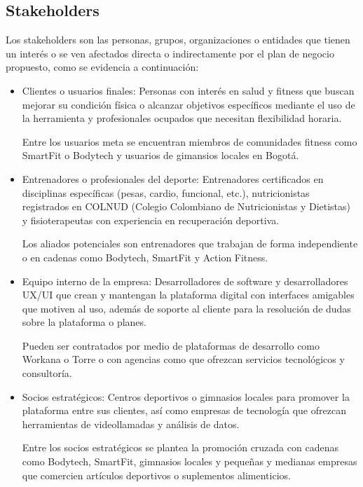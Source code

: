 \subsection{Stakeholders}

{\color{red}
Los stakeholders son las personas, grupos, organizaciones o entidades que tienen un interés o se ven afectados directa o indirectamente por el plan de negocio propuesto, como se evidencia a continuación: 

\begin{itemize}
    \item Clientes o usuarios finales: Personas con interés en salud y fitness que buscan mejorar su condición física o alcanzar objetivos específicos mediante el uso de la herramienta y profesionales ocupados que necesitan flexibilidad horaria. 

    Entre los usuarios meta se encuentran miembros de comunidades fitness como SmartFit o Bodytech y usuarios de gimansios locales en Bogotá.
    
    \item Entrenadores o profesionales del deporte: Entrenadores certificados en disciplinas específicas (pesas, cardio, funcional, etc.), nutricionistas registrados en COLNUD (Colegio Colombiano de Nutricionistas y Dietistas) y fisioterapeutas con experiencia en recuperación deportiva. 

    Los aliados potenciales son entrenadores que trabajan de forma independiente o en cadenas como Bodytech, SmartFit y Action Fitness. 
    
    \item Equipo interno de la empresa: Desarrolladores de software y desarrolladores UX/UI que crean y mantengan la plataforma digital con interfaces amigables que motiven al uso, además de soporte al cliente para la resolución de dudas sobre la plataforma o planes. 

    Pueden ser contratados por medio de plataformas de desarrollo como Workana o Torre o con agencias como que ofrezcan servicios tecnológicos y consultoría. 
    
    \item Socios estratégicos: Centros deportivos o gimnasios locales para promover la plataforma entre sus clientes, así como empresas de tecnología que ofrezcan herramientas de videollamadas y análisis de datos. 

    Entre los socios estratégicos se plantea la promoción cruzada con cadenas como Bodytech, SmartFit, gimnasios locales y pequeñas y medianas empresas que comercien artículos deportivos o suplementos alimenticios.     
    

\end{itemize}}
